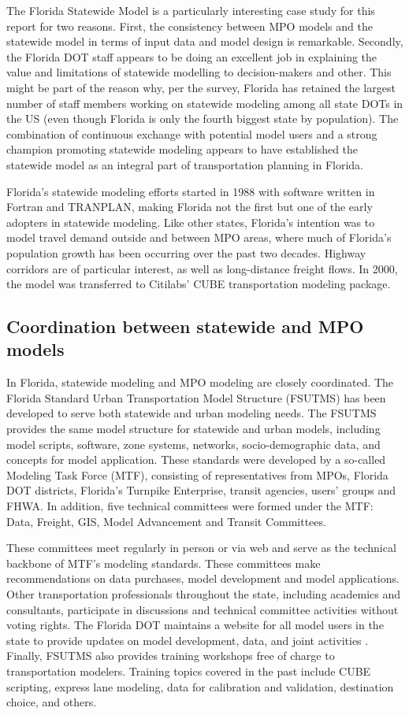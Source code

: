 The Florida Statewide Model is a particularly interesting case study for this report for two reasons. First, the consistency between MPO models and the statewide model in terms of input data and model design is remarkable. Secondly, the Florida DOT staff appears to be doing an excellent job in explaining the value and limitations of statewide modelling to decision-makers and other. This might be part of the reason why, per the survey, Florida has retained the largest number of staff members working on statewide modeling among all state DOTs in the US (even though Florida is only the fourth biggest state by population). The combination of continuous exchange with potential model users and a strong champion promoting statewide modeling appears to have established the statewide model as an integral part of transportation planning in Florida.

Florida's statewide modeling efforts started in 1988 with software written in Fortran and TRANPLAN, making Florida not the first but one of the early adopters in statewide modeling. Like other states, Florida's intention was to model travel demand outside and between MPO areas, where much of Florida's population growth has been occurring over the past two decades. Highway corridors are of particular interest, as well as long-distance freight flows. In 2000, the model was transferred to Citilabs' CUBE transportation modeling package.

\subsection{Coordination between statewide and MPO models}

In Florida, statewide modeling and MPO modeling are closely coordinated. The Florida Standard Urban Transportation Model Structure (FSUTMS) has been developed to serve both statewide and urban modeling needs. The FSUTMS provides the same model structure for statewide and urban models, including model scripts, software, zone systems, networks, socio-demographic data, and concepts for model application. These standards were developed by a so-called Modeling Task Force (MTF), consisting of representatives from MPOs, Florida DOT districts, Florida's Turnpike Enterprise, transit agencies, users' groups and FHWA. In addition, five technical committees were formed under the MTF: Data, Freight, GIS, Model Advancement and Transit Committees. 

These committees meet regularly in person or via web and serve as the technical backbone of MTF's modeling standards. These committees make recommendations on data purchases, model development and model applications. Other transportation professionals throughout the state, including academics and consultants, participate in discussions and technical committee activities without voting rights. The Florida DOT maintains a website for all model users in the state to provide updates on model development, data, and joint activities \citep{floridadot16}. Finally, FSUTMS also provides training workshops free of charge to transportation modelers. Training topics covered in the past include CUBE scripting, express lane modeling, data for calibration and validation, destination choice, and others.

